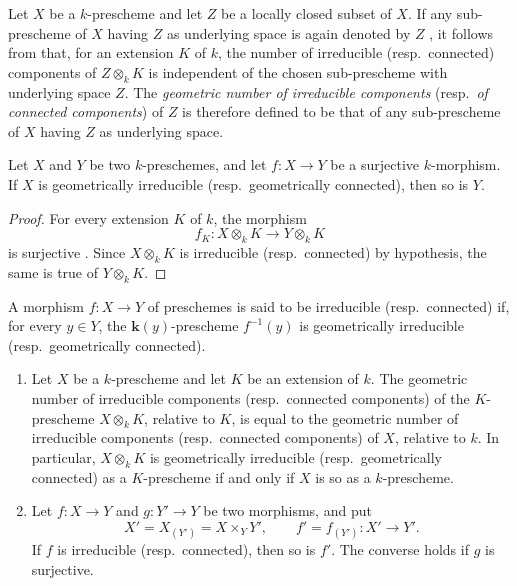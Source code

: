 \begin{env}[4.5.3]
\label{IV.4.5.3}
Let $X$ be a $k$-prescheme and let $Z$ be a locally closed subset of
$X$.
If any sub-prescheme of $X$ having $Z$ as underlying space is again
denoted by $Z$ , it follows from 
that, for an extension $K$ of $k$, the number of irreducible
(resp.\ connected) components of $Z\otimes_k K$ is independent of the
chosen sub-prescheme with underlying space $Z$.
The \emph{geometric number of irreducible components}
(resp.\ \emph{of connected components}) of $Z$ is therefore defined to
be that of any sub-prescheme of $X$ having $Z$ as underlying space.
\end{env}

\begin{proposition}[4.5.4]
\label{IV.4.5.4}
Let $X$ and $Y$ be two $k$-preschemes, and let $f:X\to Y$ be a
surjective $k$-morphism.
If $X$ is geometrically irreducible \textup{(resp.\ }geometrically connected\textup{)},
then so is $Y$.
\end{proposition}


\begin{proof}
For every extension $K$ of $k$, the morphism
\[
f_K:X\otimes_k K\longrightarrow Y\otimes_k K
\]
is surjective .
Since $X\otimes_k K$ is irreducible (resp.\ connected) by hypothesis,
the same is true of $Y\otimes_k K$.
\end{proof}

\begin{definition}[4.5.5]
\label{IV.4.5.5}
A morphism $f:X\to Y$ of preschemes is said to be
irreducible (resp.\ connected) if, for every $y\in Y$,
the $\boldsymbol{k}(y)$-prescheme $f^{-1}(y)$ is geometrically irreducible
(resp.\ geometrically connected).
\end{definition}

\begin{proposition}[4.5.6]
\label{IV.4.5.6}
\begin{enumerate}
\item[\rm(i)]
\label{IV.4.5.6.i}
Let $X$ be a $k$-prescheme and let $K$ be an extension of $k$.
The geometric number of irreducible components \textup{(resp.\ }connected
components\textup{)} of the $K$-prescheme $X\otimes_k K$, relative to $K$, is
equal to the geometric number of irreducible components
\textup{(resp.\ }connected components\textup{)} of $X$, relative to $k$.
In particular, $X\otimes_k K$ is geometrically irreducible
\textup{(resp.\ }geometrically connected\textup{)} as a $K$-prescheme if and only if
$X$ is so as a $k$-prescheme.

\item[\rm(ii)]
\label{IV.4.5.6.ii}
Let $f:X\to Y$ and $g:Y'\to Y$ be two morphisms, and put
\[
X'=X_{(Y')}=X\times_Y Y',
\qquad
f'=f_{(Y')}:X'\longrightarrow Y'.
\]
If $f$ is irreducible \textup{(resp.\ }connected\textup{)}, then so is $f'$.
The converse holds if $g$ is surjective.
\end{enumerate}
\end{proposition}

